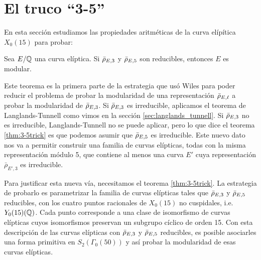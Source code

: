 \documentclass[../../tesis_maestria]{subfiles}
\begin{document}
\section{El truco ``3-5''}\label{sec:3-5}


%

En esta secci\'on estudiamos las propiedades aritméticas de la curva elípítica $X_0(15)$ para probar:

\begin{thm}\label{thm:3-5trick}%
	Sea $E/\mathbb{Q}$ una curva elíptica. Si $\bar{\rho}_{E,3}$ y $\bar{\rho}_{E,5}$ son reducibles, entonces $E$ es modular.
\end{thm}

Este teorema es la  primera parte de la estrategia que usó Wiles para poder reducir el problema de probar la modularidad de una representación $\bar{\rho}_{E,\ell}$ a probar la modularidad de $\bar{\rho}_{E,3}$. Si $\bar{\rho}_{E,3}$ es irreducible, aplicamos el teorema de Langlands-Tunnell como vimos en la sección \ref{sec:langlands_tunnell}. Si $\bar{\rho}_{E,3}$ no es irreducible, Langlands-Tunnell no se puede aplicar, pero lo que dice el teorema \ref{thm:3-5trick} es que podemos asumir que $\bar{\rho}_{E,5}$ es irreducible. Este nuevo dato nos va a permitir construir una familia de curvas elípticas, todas con la misma representación módulo 5, que contiene al menos una curva $E'$ cuya representación $\bar{\rho}_{E',3}$ es irreducible.

Para justificar esta nueva vía, necesitamos el teorema \ref{thm:3-5trick}. La estrategia de probarlo es parametrizar la familia de curvas elípticas tales que $\bar{\rho}_{E,3}$ y $\bar{\rho}_{E,5}$ reducibles, con los cuatro puntos racionales de $X_0(15)$ no cuspidales, i.e. $Y_0(15)(\mathbb{Q})$. Cada punto corresponde a una clase de isomorfismo de curvas elípticas cuyos isomorfismos preservan un subgrupo cíclico de orden 15. Con esta descripción de las curvas elípticas con $\bar{\rho}_{E,3}$ y $\bar{\rho}_{E,5}$ reducibles, es posible asociarles una forma primitiva en $S_2(\Gamma_0(50))$ y así probar la modularidad de esas curvas elípticas. 
\end{document}
